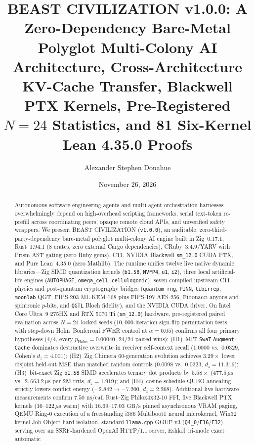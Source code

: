 \documentclass[11pt,letterpaper]{amsart}
\title[BEAST CIVILIZATION v1.0.0]{%
  BEAST CIVILIZATION v1.0.0: A Zero-Dependency Bare-Metal Polyglot Multi-Colony AI Architecture, Cross-Architecture KV-Cache Transfer, Blackwell PTX Kernels, Pre-Registered \texorpdfstring{$N=24$}{N=24} Statistics, and 81 Six-Kernel Lean 4.35.0 Proofs%
}
\author{Alexander Stephen Donahue}
\date{November 26, 2026}
\newcommand{\code}[1]{{\small\texttt{#1}}}
\begin{document}
\begin{abstract}
Autonomous software-engineering agents and multi-agent orchestration harnesses
overwhelmingly depend on high-overhead scripting frameworks, serial text-token
re-prefill across coordinating peers, opaque remote cloud APIs, and unverified
safety wrappers. We present \textsc{BEAST CIVILIZATION} (\code{v1.0.0}), an
auditable, zero-third-party-dependency bare-metal polyglot multi-colony AI engine
built in Zig~0.17.1, Rust~1.94.1 ($8$ crates, zero external Cargo dependencies),
CRuby~3.4.9/YARV with Prism AST gating (zero Ruby gems), C11, NVIDIA Blackwell
\code{sm\_12.0} CUDA PTX, and Pure Lean~4.35.0 (zero Mathlib). The runtime unifies
twelve live native dynamic libraries---Zig SIMD quantization kernels (\code{b1.58},
\code{NVFP4}, \code{u1}, \code{i2}), three local artificial-life engines
(\code{AUTOPHAGE}, \code{omega\_cell}, \code{cellulogonic}), seven compiled
upstream C11 physics and post-quantum cryptography bridges (\code{quantum\_rng},
\code{PINN}, \code{libirrep}, \code{moonlab} QGT, FIPS-203 ML-KEM-768 plus
FIPS-197 AES-256, Fibonacci anyons and spintronic $p$-bits, and \code{QGTL} Bloch
fidelity), and the NVIDIA CUDA driver. On Intel Core Ultra~9 275HX and RTX 5070 Ti
(\code{sm\_12.0}) hardware, pre-registered paired evaluation across $N=24$ locked
seeds ($10{,}000$-iteration sign-flip permutation tests with step-down
Holm--Bonferroni FWER control at $\alpha=0.05$) confirms all four primary
hypotheses ($4/4$, every $p_{\mathrm{Holm}} = 0.00040$, $24/24$ paired wins):
(H1)~MIT \code{SwaT} \code{Augment-Cache} dominates destructive overwrite in
receiver self-context recall ($1.0000$ vs.\ $0.0329$, Cohen's $d_z = 4.001$);
(H2)~Zig Chimera 60-generation evolution achieves $3.29\times$ lower disjoint
held-out MSE than matched random controls ($0.0098$ vs.\ $0.0323$, $d_z = 11.316$);
(H3)~bit-exact Zig \code{b1.58} SIMD accelerates ternary dot products by
$5.58\times$ ($477.5\,\mu\text{s}$ vs.\ $2{,}663.2\,\mu\text{s}$ per 2M trits,
$d_z = 1.919$); and (H4)~cosine-schedule QUBO annealing strictly lowers conflict
energy ($-2.842 \to -7.200$, $d_z = 2.268$). Additional live hardware measurements
confirm $7.50\text{ ns/call}$ Rust--Zig Philox4x32-10 FFI, five Blackwell PTX
kernels ($16\text{--}122\,\mu\text{s}$ warm) with $16.69\text{--}17.03\text{ GB/s}$
pinned asynchronous VRAM paging, QEMU Ring-0 execution of a freestanding i386
Multiboot1 neural microkernel, Win32 kernel Job Object hard isolation, standard
\code{llama.cpp} GGUF v3 (\code{Q4\_0}/\code{F16}/\code{F32}) serving over an
SSRF-hardened OpenAI HTTP/1.1 server, Eshkol tri-mode exact automatic

\end{abstract}
\end{document}

